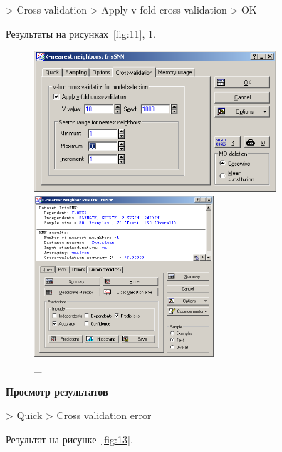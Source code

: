 > Cross-validation > Apply v-fold cross-validation > OK

Результаты на рисунках~\ref{fig:11}, \ref{fig:12}.

\begin{figure}[!h]
  \centering

  \begin{minipage}{0.49\textwidth}
    \centering

    \includegraphics[width=9cm]
    {inc/ex_12.PNG}

    \caption{\_}

    \label{fig:11}
  \end{minipage}
  \begin{minipage}{0.49\textwidth}
    \centering

    \includegraphics[height=6cm]
    {inc/ex_13.PNG}

    \caption{\_}

    \label{fig:12}
  \end{minipage}
\end{figure}

\begin{center}
  \textbf{Просмотр результатов}
\end{center}

> Quick > Cross validation error

Результат на рисунке~\ref{fig:13}.


